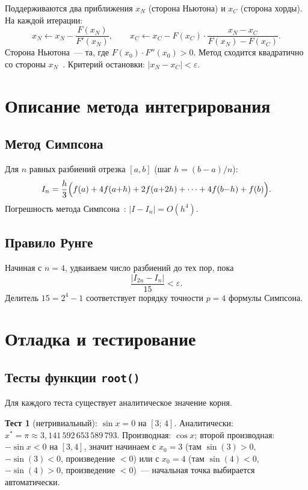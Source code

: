 \documentclass[a4paper,12pt,titlepage,finall]{article}
\begin{document}
Поддерживаются два приближения $x_N$ (сторона Ньютона)
и $x_C$ (сторона хорды). На каждой итерации:
\[
    x_N \leftarrow x_N - \frac{F(x_N)}{F'(x_N)}, \qquad
    x_C \leftarrow x_C - F(x_C)\cdot\frac{x_N-x_C}{F(x_N)-F(x_C)}.
\]
Сторона Ньютона~--- та, где $F(x_0)\cdot F''(x_0)>0$.
Метод сходится квадратично со стороны $x_N$~\cite{math}.
Критерий остановки: $|x_N-x_C|<\varepsilon$.

\newpage

\section{Описание метода интегрирования}

\subsection{Метод Симпсона}

Для $n$ равных разбиений отрезка $[a,b]$ (шаг $h=(b-a)/n$):
\[
    I_n = \frac{h}{3}\Bigl(f(a)+4f(a{+}h)+2f(a{+}2h)+\cdots+4f(b{-}h)+f(b)\Bigr).
\]
Погрешность метода Симпсона~\cite{math}: $|I-I_n|=O(h^4)$.

\subsection{Правило Рунге}

Начиная с $n=4$, удваиваем число разбиений до тех пор, пока
\[
    \frac{|I_{2n}-I_n|}{15} < \varepsilon.
\]
Делитель $15=2^4-1$ соответствует порядку точности $p=4$
формулы Симпсона.

\newpage

\section{Отладка и тестирование}

\subsection{Тесты функции \texttt{root()}}

Для каждого теста существует аналитическое значение корня.

\textbf{Тест 1} (нетривиальный): $\sin x = 0$ на $[3;\,4]$.
Аналитически: $x^* = \pi \approx 3{,}141\,592\,653\,589\,793$.
Производная: $\cos x$; второй производная: $-\sin x < 0$ на $[3,4]$,
значит начинаем с $x_0 = 3$ (там $\sin(3)>0$, $-\sin(3)<0$, произведение
$<0$) или с $x_0=4$ (там $\sin(4)<0$, $-\sin(4)>0$, произведение
$<0$)~--- начальная точка выбирается автоматически.
\end{document}
